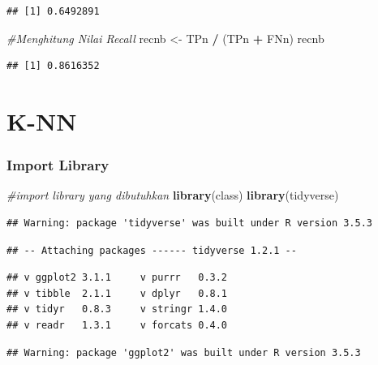 \documentclass[]{article}
\newenvironment{Shaded}{\begin{snugshade}}{\end{snugshade}}
\newcommand{\CommentTok}[1]{\textcolor[rgb]{0.56,0.35,0.01}{\textit{#1}}}
\newcommand{\KeywordTok}[1]{\textcolor[rgb]{0.13,0.29,0.53}{\textbf{#1}}}
\newcommand{\NormalTok}[1]{#1}
\newcommand{\OperatorTok}[1]{\textcolor[rgb]{0.81,0.36,0.00}{\textbf{#1}}}
\newcommand{\StringTok}[1]{\textcolor[rgb]{0.31,0.60,0.02}{#1}}
\begin{document}
\begin{verbatim}
## [1] 0.6492891
\end{verbatim}

\begin{Shaded}
\begin{Highlighting}[]
\CommentTok{#Menghitung Nilai Recall}
\NormalTok{recnb <-}\StringTok{ }\NormalTok{TPn }\OperatorTok{/}\StringTok{ }\NormalTok{(TPn }\OperatorTok{+}\StringTok{ }\NormalTok{FNn)}
\NormalTok{recnb}
\end{Highlighting}
\end{Shaded}

\begin{verbatim}
## [1] 0.8616352
\end{verbatim}

\hypertarget{k-nn}{%
\section{K-NN}\label{k-nn}}

\hypertarget{import-library-2}{%
\subsubsection{Import Library}\label{import-library-2}}

\begin{Shaded}
\begin{Highlighting}[]
\CommentTok{#import library yang dibutuhkan}
\KeywordTok{library}\NormalTok{(class)}
\KeywordTok{library}\NormalTok{(tidyverse)}
\end{Highlighting}
\end{Shaded}

\begin{verbatim}
## Warning: package 'tidyverse' was built under R version 3.5.3
\end{verbatim}

\begin{verbatim}
## -- Attaching packages ------ tidyverse 1.2.1 --
\end{verbatim}

\begin{verbatim}
## v ggplot2 3.1.1     v purrr   0.3.2
## v tibble  2.1.1     v dplyr   0.8.1
## v tidyr   0.8.3     v stringr 1.4.0
## v readr   1.3.1     v forcats 0.4.0
\end{verbatim}

\begin{verbatim}
## Warning: package 'ggplot2' was built under R version 3.5.3
\end{verbatim}
\end{document}
